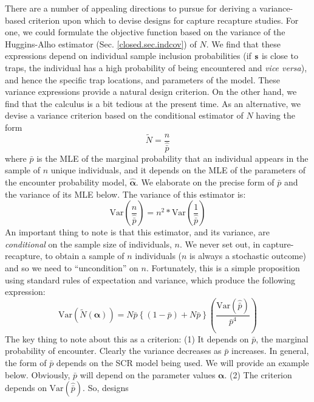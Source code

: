 There are a number of appealing directions to pursue for deriving a
variance-based criterion upon which to devise designs for capture
recapture studies.  For one, we could formulate the objective function
based on the variance of the Huggins-Alho estimator (Sec. \ref{closed.sec.indcov}) of $N$.  
We find that these expressions depend on individual sample inclusion
probabilities (if ${\bf s}$ is close to traps, the individual has a
high probability of being encountered and {\it vice versa}), and hence
the specific trap locations, and parameters of the model.  These
variance expressions provide a natural design criterion. On the other
hand, we find that the calculus is a bit tedious at the present time.
As an alternative, we
devise a variance criterion based on the conditional estimator of $N$
having the form
\[
  \tilde{N}  =  \frac{n}{\hat{\bar{p}}}
\]
where $\hat{\bar{p}}$ is the MLE of the marginal probability that an
individual appears in the sample of $n$ unique individuals, and it
depends on the MLE of the parameters of the encounter probability
model, $\hat{\bm \alpha}$.  We elaborate on the precise form of
$\bar{p}$ and the variance of its MLE below.  The variance of this
estimator is:
\[
\mbox{Var}(\frac{n}{\hat{\bar{p}}}) = n^2 * \mbox{Var}(
\frac{1}{\hat{\bar{p}}} )
\]
An important thing to note is that this estimator, and its variance, 
are  {\it conditional}
on the sample size of individuals, $n$. We never set out, in capture-recapture, to obtain a sample of
$n$ individuals ($n$ is always a stochastic outcome) and so we need to 
``uncondition'' on $n$.
Fortunately, this is a simple proposition using standard rules of
expectation and variance, which produce the following expression:
\begin{equation}
 \mbox{Var}(\tilde{N}(\bm \alpha) ) =
  N \bar{p} \left\{ (1-\bar{p}) + N \bar{p} \right\}
\left( \frac{ \mbox{Var}( \hat{\bar{p}}) } { \bar{p}^{4} } \right)
\label{design.eq.theQ}
\end{equation}
The key thing to note about this as a criterion:
 (1) It depends on $\bar{p}$, the marginal probability of
 encounter. Clearly the variance decreases as $\bar{p}$ increases. In
 general, the form of $\bar{p}$ depends on the SCR model being used. We
 will provide an example below. Obviously, $\bar{p}$ will depend on
 the parameter values ${\bm \alpha}$. 
 (2) The criterion depends on $\mbox{Var}(\hat{\bar{p}})$. So, designs
